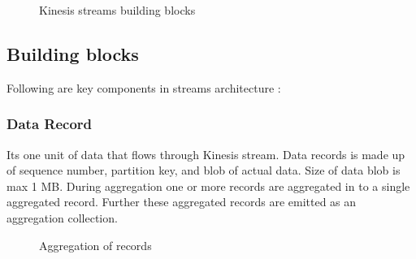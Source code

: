 \documentclass[9pt,twocolumn,twoside]{../../styles/osajnl}
\begin{document}
\begin{figure}[htbp]
\centering
{}
\caption{Kinesis streams building blocks \cite{www-kinesis-arch}}
\label{fig:false-color}
\end{figure}

\subsection{Building blocks}
Following are key components in streams architecture \cite{www-kinesis-arch} :

\subsubsection{Data Record}
Its one unit of data that flows through Kinesis stream. Data records is made up
of sequence number, partition key, and blob of actual data. Size of data blob is
max 1 MB. During aggregation one or more records are aggregated in to a single
aggregated record. Further these aggregated records are emitted as an
aggregation collection.

\begin{figure}[htbp]
\centering
{}
\caption{Aggregation of records}
\label{fig:false-color}
\end{figure}
\end{document}
